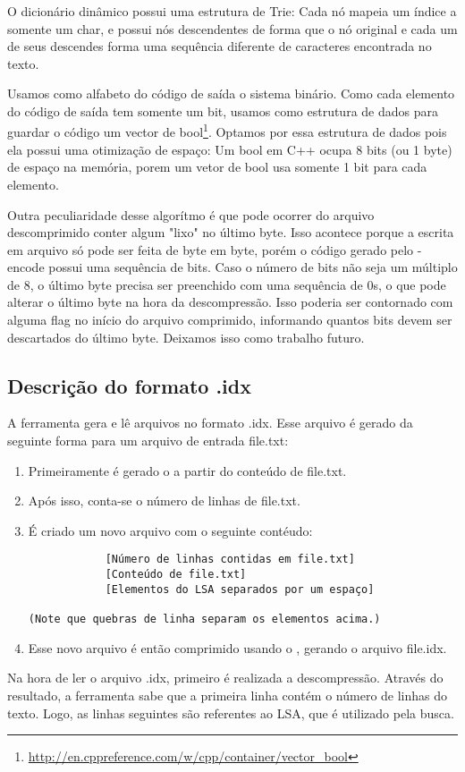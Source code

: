 \subsubsection{\lz}
O dicionário dinâmico possui uma estrutura de Trie: Cada nó mapeia um índice a
somente um char, e possui nós descendentes de forma que o nó original e cada um
de seus descendes forma uma sequência diferente de caracteres encontrada no
texto.

Usamos como alfabeto do código de saída o sistema binário. Como cada elemento do
código de saída tem somente um bit, usamos como estrutura de dados para guardar
o código um vector de
bool\footnote{\url{http://en.cppreference.com/w/cpp/container/vector_bool}}.
Optamos por essa estrutura de dados pois ela possui uma otimização de espaço:
Um bool em C++ ocupa 8 bits (ou 1 byte) de espaço na memória, porem um vetor de
bool usa somente 1 bit para cada elemento.

Outra peculiaridade desse algorítmo é que pode ocorrer do arquivo descomprimido
conter algum "lixo" no último byte. Isso acontece porque a escrita em arquivo só
pode ser feita de byte em byte, porém o código gerado pelo \lz-encode possui uma
sequência de bits. Caso o número de bits não seja um múltiplo de 8, o último
byte precisa ser preenchido com uma sequência de 0s, o que pode alterar o último
byte na hora da descompressão. Isso poderia ser contornado com alguma flag no
início do arquivo comprimido, informando quantos bits devem ser descartados do
último byte. Deixamos isso como trabalho futuro.

\subsection{Descrição do formato .idx}

A ferramenta \ipmt gera e lê arquivos no formato .idx. Esse arquivo é gerado da
seguinte forma para um arquivo de entrada file.txt:

\begin{enumerate}

\item Primeiramente é gerado o \lsa a partir do conteúdo de file.txt.
\item Após isso, conta-se o número de linhas de file.txt.
\item É criado um novo arquivo com o seguinte contéudo:
\begin{verbatim}
            [Número de linhas contidas em file.txt]
            [Conteúdo de file.txt]
            [Elementos do LSA separados por um espaço]

(Note que quebras de linha separam os elementos acima.)
\end{verbatim}
\item Esse novo arquivo é então comprimido usando o \lz, gerando o arquivo file.idx.

\end{enumerate}

Na hora de ler o arquivo .idx, primeiro é realizada a descompressão. Através do
resultado, a ferramenta sabe que a primeira linha contém o número de linhas do
texto. Logo, as linhas seguintes são referentes ao LSA, que é utilizado pela
busca.
